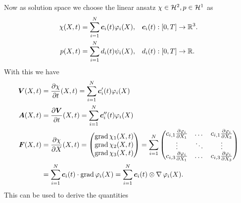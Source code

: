 Now as solution space we choose the linear ansatz $\chi\in\H^2, p\in\H^1$ as
\begin{align}
	\chi(X,t) &= \sumi \vc_i(t)\varphi_i(X), && \vc_i(t):[0,T] \to\R^3.\\
	p(X,t) &= \sumi d_i(t)\psi_i(X), && d_i(t):[0,T] \to\R.
\end{align}
With this we have
\begin{align}
	\vV(X,t) &= \d{\chi}{t}(X,t) = \sumi \vc_i'(t)\varphi_i(X)\\
	\vA(X,t) &= \d{\vV}{t}(X,t) = \sumi \vc_i''(t)\varphi_i(X)\\
	\vF(X,t) &= \d{\chi}{X}(X,t) = \m{\grad \chi_1(X,t)\\ \grad \chi_2(X,t)\\ \grad \chi_3(X,t)}
		   = \sumi\m{c_{i,1}\d{\varphi_i}{X_1} & \dots & c_{i,1}\d{\varphi_i}{X_3}\\
		   				\vdots & \ddots & \vdots\\
		   				c_{i,3}\d{\varphi_i}{X_1} & \dots & c_{i,3}\d{\varphi_i}{X_3}}\\
		   &=\sumi \vc_i(t)\cdot \grad\varphi_i(X) = \sumi \vc_i(t)\otimes \divergence\varphi_i(X).
\end{align}
This can be used to derive the quantities
